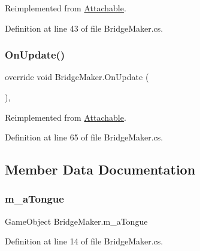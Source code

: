 Reimplemented from \mbox{\hyperlink{class_attachable_a3c05c0b07b831881a7ab245057d34d30}{Attachable}}.



Definition at line 43 of file Bridge\+Maker.\+cs.

\mbox{\label{class_bridge_maker_a6c7c0e10a22698192076b53c8bc55d07}} 
\subsubsection{\texorpdfstring{On\+Update()}{OnUpdate()}}
{\footnotesize\ttfamily override void Bridge\+Maker.\+On\+Update (\begin{DoxyParamCaption}{ }\end{DoxyParamCaption})\hspace{0.3cm}{\ttfamily [protected]}, {\ttfamily [virtual]}}



Reimplemented from \mbox{\hyperlink{class_attachable_abb659a66efacd6fa09fa1d7125c7b5e6}{Attachable}}.



Definition at line 65 of file Bridge\+Maker.\+cs.



\subsection{Member Data Documentation}
\mbox{\label{class_bridge_maker_a489b2a9b18690bb1f700d4ff68a348fa}} 
\subsubsection{\texorpdfstring{m\+\_\+a\+Tongue}{m\_aTongue}}
{\footnotesize\ttfamily Game\+Object Bridge\+Maker.\+m\+\_\+a\+Tongue}



Definition at line 14 of file Bridge\+Maker.\+cs.

\mbox{\label{class_bridge_maker_a9c58da197b7f29a9b3db6568a4d97a71}} 
